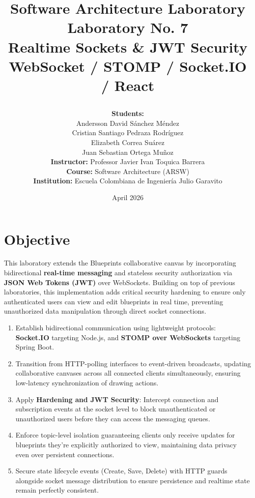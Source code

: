 \documentclass[10pt,a4paper,twocolumn]{article}
\title{\vspace{-1cm}
    \begin{center}
        \imgplaceholder{3cm}{media/university_logo.png}
    \end{center}
    \vspace{1.5cm}
    \textbf{\Large Software Architecture Laboratory}\\
    \vspace{1cm}
    \textbf{\huge Laboratory No. 7}\\
    \textbf{\huge Realtime Sockets \& JWT Security}\\
    \vspace{1.5cm}
    \large WebSocket / STOMP / Socket.IO / React
}
\author{
    \vspace{2cm}
    \textbf{Students:}\\[0.05cm]
    Andersson David S\'{a}nchez M\'{e}ndez\\[0.3cm]
    Cristian Santiago Pedraza Rodr\'{i}guez\\[0.3cm]
    Elizabeth Correa Su\'{a}rez\\[0.3cm]
    Juan Sebastian Ortega Mu\~{n}oz\\[1.5cm]
    \textbf{Instructor:} Professor Javier Ivan Toquica Barrera\\[0.5cm]
    \textbf{Course:} Software Architecture (ARSW)\\[0.3cm]
    \textbf{Institution:} Escuela Colombiana de Ingenier\'{i}a Julio Garavito\\[2cm]
}
\date{April 2026}
\begin{document}
\onecolumn
\maketitle
\thispagestyle{empty}
\newpage

\tableofcontents
\newpage

\twocolumn

\section{Objective}

This laboratory extends the Blueprints collaborative canvas by incorporating 
bidirectional \textbf{real-time messaging} and stateless security authorization 
via \textbf{JSON Web Tokens (JWT)} over WebSockets. Building on top of previous 
laboratories, this implementation adds critical security hardening to ensure only 
authenticated users can view and edit blueprints in real time, preventing unauthorized 
data manipulation through direct socket connections.

\begin{conceptbox}[title={Realtime \& Security Objectives}]
\begin{enumerate}
  \item Establish bidirectional communication using lightweight protocols: 
        \textbf{Socket.IO} targeting Node.js, and \textbf{STOMP over WebSockets} 
        targeting Spring Boot.
  \item Transition from HTTP-polling interfaces to event-driven broadcasts, 
        updating collaborative canvases across all connected clients simultaneously, 
        ensuring low-latency synchronization of drawing actions.
  \item Apply \textbf{Hardening and JWT Security}: Intercept connection 
        and subscription events at the socket level to block unauthenticated or 
        unauthorized users before they can access the messaging queues.
  \item Enforce topic-level isolation guaranteeing clients only receive updates 
        for blueprints they're explicitly authorized to view, maintaining data privacy 
        even over persistent connections.
  \item Secure state lifecycle events (Create, Save, Delete) with HTTP guards 
        alongside socket message distribution to ensure persistence and realtime state 
        remain perfectly consistent.
\end{enumerate}
\end{conceptbox}
\end{document}
